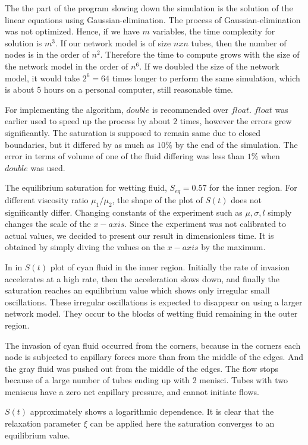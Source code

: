 \documentclass[
	12pt
] {article}
\begin{document}
	The the part of the program slowing down the simulation is the solution of the linear equations using Gaussian-elimination. The process of Gaussian-elimination was not optimized. Hence, if we have $m$ variables, the time complexity for solution is $m^3$. If our network model is of size $n x n$ tubes, then the number of nodes is in the order of $n^2$. Therefore the time to compute grows with the size of the network model in the order of $n^6$. If we doubled the size of the network model, it would take $2^6 = 64$ times longer to perform the same simulation, which is about 5 hours on a personal computer, still reasonable time.
		
	For implementing the algorithm, $double$ is recommended over $float$. $float$ was earlier used to speed up the process by about $2$ times, however the errors grew significantly. The saturation is supposed to remain same due to closed boundaries, but it differed by as much as $10\%$ by the end of the simulation. The error in terms of volume of one of the fluid differing was less than $1\%$ when $double$ was used.
	
	The equilibrium saturation for wetting fluid, $S_{eq} = 0.57$ for the inner region. For different viscosity ratio ${\mu}_1 / {\mu_2}$, the shape of the plot of $S(t)$ does not significantly differ. Changing constants of the experiment such as $\mu, \sigma, l$ simply changes the scale of the $x-axis$. Since the experiment was not calibrated to actual values, we decided to present our result in dimensionless time. It is obtained by simply diving the values on the $x-axis$ by the maximum.
		
	In in $S(t)$ plot of cyan fluid in the inner region. Initially the rate of invasion accelerates at a high rate, then the acceleration slows down, and finally the saturation reaches an equilibrium value which shows only irregular small oscillations. These irregular oscillations is expected to disappear on using a larger network model. They occur to the blocks of wetting fluid remaining in the outer region.
		
	The invasion of cyan fluid occurred from the corners, because in the corners each node is subjected to capillary forces more than from the middle of the edges. And the gray fluid was pushed out from the middle of the edges. The flow stops because of a large number of tubes ending up with 2 menisci. Tubes with two meniscus have a zero net capillary pressure, and cannot initiate flows. 
		
	$S(t)$ approximately shows a logarithmic dependence. It is clear that the relaxation parameter $\xi$ can be applied here the saturation converges to an equilibrium value.
	
\end{document}
